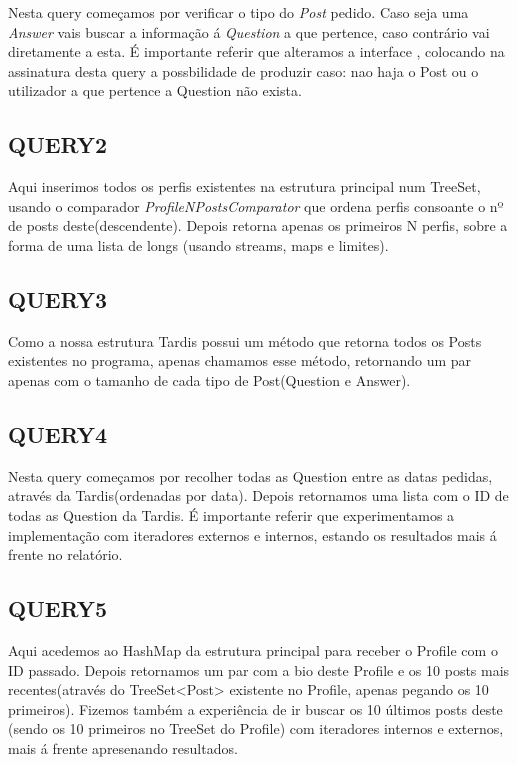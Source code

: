 \documentclass[letterpaper, 10 pt, conference]{IEEEtran} %
\begin{document}
Nesta query começamos por verificar o tipo do \textit{Post} pedido. Caso seja uma \textit{Answer} vais buscar a informação
á \textit{Question} a que pertence, caso contrário vai diretamente a esta.
É importante referir que alteramos a interface , colocando na assinatura desta query a
possbilidade de produzir  caso: nao haja o Post ou o utilizador a que pertence a Question não exista.


\subsection{QUERY2}

Aqui inserimos todos os perfis existentes na estrutura principal num TreeSet, usando o comparador \textit{ProfileNPostsComparator}
que ordena perfis consoante o nº de posts deste(descendente). Depois retorna apenas os primeiros N
perfis, sobre a forma de uma lista de longs (usando streams, maps e limites).

\subsection{QUERY3}

Como a nossa estrutura Tardis possui um método que retorna todos os Posts existentes no programa, apenas chamamos esse método,
retornando um par apenas com o tamanho de cada tipo de Post(Question e Answer).

\subsection{QUERY4}

Nesta query começamos por recolher todas as Question entre as datas pedidas, através da Tardis(ordenadas por data).
Depois retornamos uma lista com o ID de todas as Question da Tardis.
\newline
É importante referir que experimentamos a implementação com iteradores externos e internos, estando os resultados mais á frente
no relatório.

\subsection{QUERY5}

Aqui acedemos ao HashMap da estrutura principal para receber o Profile com o ID passado. Depois retornamos um par com a bio deste Profile e os
10 posts mais recentes(através do TreeSet<Post> existente no Profile, apenas pegando os 10 primeiros).
Fizemos também a experiência de ir buscar os 10 últimos posts deste (sendo os 10 primeiros no TreeSet do Profile) com
iteradores internos e externos, mais á frente apresenando resultados.
\end{document}
